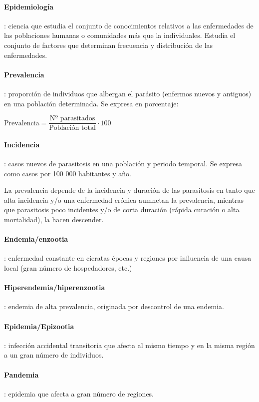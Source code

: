 \documentclass[10pt,a4paper,onecolumn,openany]{book}
\begin{document}
\paragraph{Epidemiología}: ciencia que estudia el conjunto de conocimientos relativos a las enfermedades de las poblaciones humanas o comunidades más que la individuales. Estudia el conjunto de factores que determinan frecuencia y distribución de las enfermedades.
\paragraph{Prevalencia}: proporción de individuos que albergan el parásito (enfermos nuevos y antiguos) en una población determinada. Se expresa en porcentaje:
\begin{center}
	\begin{math}
		\mbox{Prevalencia} = \dfrac{\mbox{Nº parasitados}}{\mbox{Población total}} \cdot 100
	\end{math}
\end{center}
\paragraph{Incidencia}: casos nuevos de parasitosis en una población y periodo temporal. Se expresa como casos por 100 000 habitantes y año.

La prevalencia depende de la incidencia y duración de las parasitosis en tanto que alta incidencia y/o una enfermedad crónica aumnetan la prevalencia, mientras que parasitosis poco incidentes y/o de corta duración (rápida curación o alta mortalidad), la hacen descender.

\paragraph{Endemia/enzootia}: enfermedad constante en cieratas épocas y regiones por influencia de una causa local (gran número de hospedadores, etc.)
\paragraph{Hiperendemia/hiperenzootia}: endemia de alta prevalencia, originada por descontrol de una endemia.
\paragraph{Epidemia/Epizootia}: infección accidental transitoria que afecta al mismo tiempo y en la misma región a un gran número de individuos.
\paragraph{Pandemia}: epidemia que afecta a gran número de regiones.
\end{document}

